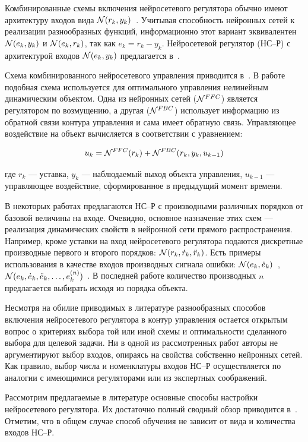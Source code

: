 Комбинированные схемы включения нейросетевого регулятора обычно имеют
архитектуру входов вида
$\mathcal{N}(r_k,y_k)$~\cite{narpart92,trc95,samtar96}.  Учитывая
способность нейронных сетей к реализации разнообразных функций,
информационно этот вариант эквивалентен $\mathcal{N}(e_k,y_k)$ и
$\mathcal{N}(e_k,r_k)$, так как $e_k=r_k-y_k$.  Нейросетевой регулятор (НС--Р)
с архитектурой входов $\mathcal{N}(e_k,y_k)$ предлагается в~\cite{narmuk96}.

Схема комбинированного нейросетевого управления приводится
в~\cite{sigom00}.  В работе~\cite{park96} подобная схема используется
для оптимального управления нелинейным динамическим объектом.  Одна из
нейронных сетей ($\mathcal{N}^{FFC}$) является регулятором по возмущению, а
другая ($\mathcal{N}^{FBC}$) использует информацию из обратной связи контура
управления и сама имеет обратную связь.  Управляющее воздействие на
объект вычисляется в соответствии с уравнением:

$$
u_{k}=\mathcal{N}^{FFC}(r_k)+\mathcal{N}^{FBC}(r_k, y_k, u_{k-1})
$$

\noindent
где $r_k$ --- уставка, $y_k$ --- наблюдаемый выход объекта управления,
$u_{k-1}$ --- управляющее воздействие, сформированное в предыдущий
момент времени.

В некоторых работах предлагаются НС--Р с производными различных
порядков от базовой величины на входе.  Очевидно, основное назначение
этих схем --- реализация динамических свойств в нейронной сети прямого
распространения.  Например, кроме уставки на вход нейросетевого
регулятора подаются дискретные производные первого и второго порядков:
$\mathcal{N}(r_k,\dot{r}_k,\ddot{r}_k)$.  Есть примеры использования в
качестве входов производных сигнала ошибки:
$\mathcal{N}(e_k,\dot{e}_k)$~\cite{wailinlin00,linwaihong01},
$\mathcal{N}(e_k,\dot{e}_k,\ddot{e}_k,\ldots,{e}^{(n)}_k)$~\cite{eremin95}.  В
последней работе количество производных $n$ предлагается выбирать
исходя из порядка объекта.

Несмотря на обилие приводимых в литературе разнообразных способов
включения нейросетевого регулятора в контур управления остается
открытым вопрос о критериях выбора той или иной схемы и оптимальности
сделанного выбора для целевой задачи.  Ни в одной из рассмотренных
работ авторы не аргументируют выбор входов, опираясь на свойства
собственно нейронных сетей.  Как правило, выбор числа и номенклатуры
входов НС--Р осуществляется по аналогии с имеющимися регуляторами или
из экспертных соображений.

Рассмотрим предлагаемые в литературе основные способы настройки
нейросетевого регулятора.  Их достаточно полный сводный обзор
приводится в~\cite{sigom00}.  Отметим, что в общем случае способ
обучения не зависит от вида и количества входов НС--Р.


